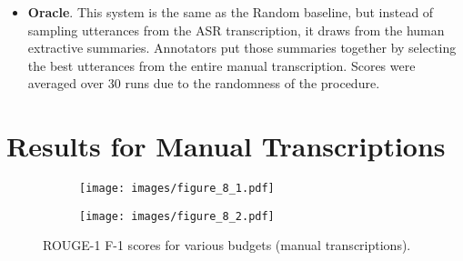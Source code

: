 \documentclass[11pt,a4paper]{article}
\begin{document}
\begin{itemize}[leftmargin=*]
\item \textbf{Oracle}. This system is the same as the Random baseline, but instead of sampling utterances from the ASR transcription, it draws from the human extractive summaries. Annotators put those summaries together by selecting the best utterances from the entire manual transcription. Scores were averaged over 30 runs due to the randomness of the procedure.
\end{itemize}

\section{Results for Manual Transcriptions}\label{app:res_manual}

\begin{figure*}[ht]
\centering

\begin{subfigure}[t]{0.49\textwidth}
\centering
\texttt{[image: images/figure\_8\_1.pdf]}
\end{subfigure}
\begin{subfigure}[t]{0.49\textwidth}
\centering
\texttt{[image: images/figure\_8\_2.pdf]}
\end{subfigure}
\caption{ROUGE-1 F-1 scores for various budgets (manual transcriptions).}
\label{fig:res_manual}
\end{figure*}
\end{document}
